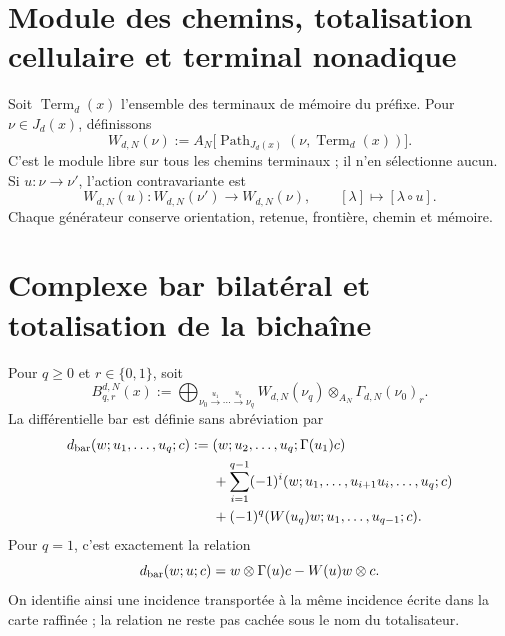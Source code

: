 \fi
\section{Module des chemins, totalisation cellulaire et terminal nonadique}
\label{sec:pdfv2-coh-route-module}

Soit \(\operatorname{Term}_d(x)\) l'ensemble des terminaux de mémoire du
préfixe. Pour \(\nu\in J_d(x)\), définissons
\begin{equation}\label{eq:pdfv2-coh-w-module}
 W_{d,N}(\nu):=
 A_N\bigl[
 \operatorname{Path}_{J_d(x)}(\nu,\operatorname{Term}_d(x))
 \bigr].
\end{equation}
C'est le module libre sur tous les chemins terminaux ; il n'en sélectionne aucun. Si
\(u:\nu\to\nu'\), l'action contravariante est
\begin{equation}\label{eq:pdfv2-coh-w-action}
 W_{d,N}(u):W_{d,N}(\nu')\longrightarrow W_{d,N}(\nu),
 \qquad
 [\lambda]\longmapsto[\lambda\circ u].
\end{equation}
Chaque générateur conserve orientation, retenue, frontière, chemin et mémoire.

\section{Complexe bar bilatéral et totalisation de la bichaîne}
\label{sec:pdfv2-coh-bar}

Pour \(q\geq0\) et \(r\in\{0,1\}\), soit
\begin{equation}\label{eq:pdfv2-coh-bar-bigraded}
 B_{q,r}^{d,N}(x):=
 \bigoplus_{\nu_0\xrightarrow{u_1}\cdots\xrightarrow{u_q}\nu_q}
 W_{d,N}(\nu_q)\otimes_{A_N}\Gamma_{d,N}(\nu_0)_r.
\end{equation}
La différentielle bar est définie sans abréviation par
\begin{align}
 d_{\rm bar}(w;u_1,\ldots,u_q;c)
 :={}&(w;u_2,\ldots,u_q;\Gamma(u_1)c)
 \nonumber\\
 &+\sum_{i=1}^{q-1}(-1)^i
 (w;u_1,\ldots,u_{i+1}u_i,\ldots,u_q;c)
 \nonumber\\
 &+(-1)^q
 (W(u_q)w;u_1,\ldots,u_{q-1};c).
 \label{eq:pdfv2-coh-bar-differential}
\end{align}
Pour \(q=1\), c'est exactement la relation
\begin{equation}\label{eq:pdfv2-coh-coend-relation}
 d_{\rm bar}(w;u;c)
 =w\otimes\Gamma(u)c-W(u)w\otimes c.
\end{equation}
On identifie ainsi une incidence transportée à la même incidence écrite
dans la carte raffinée ; la relation ne reste pas cachée sous le nom du
totalisateur.

